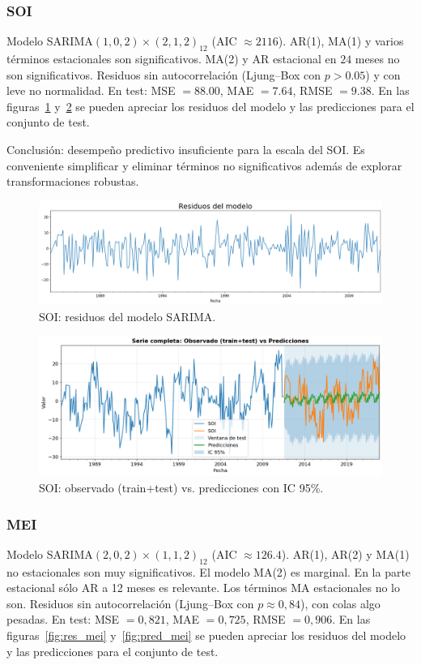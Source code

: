 \subsubsection{SOI}
Modelo SARIMA$(1,0,2)\times(2,1,2)_{12}$ (AIC $\approx 2116$).
AR(1), MA(1) y varios términos estacionales son significativos. MA(2) y AR estacional en
$24$ meses no son significativos. Residuos sin autocorrelación (Ljung--Box con $p>0.05$) y con leve
no normalidad. En test: MSE $=88.00$, MAE $=7.64$, RMSE $=9.38$. En las figuras~\ref{fig:res_soi} y~\ref{fig:pred_soi} se pueden apreciar los residuos del modelo y las predicciones para el conjunto de test.

Conclusión: desempeño predictivo insuficiente para la escala del SOI. Es conveniente simplificar y eliminar términos no significativos además de explorar transformaciones robustas.
\vspace{0.3em}

\begin{figure}[H]\centering
\includegraphics[scale=.30]{Figures/res_sarima_soi.png}
\caption{SOI: residuos del modelo SARIMA.}
\label{fig:res_soi}
\end{figure}


\begin{figure}[H]\centering
\includegraphics[scale=.42]{Figures/pred_soi.png}
\caption{SOI: observado (train+test) vs. predicciones con IC 95\%.}
\label{fig:pred_soi}
\end{figure}


\subsubsection{MEI}
Modelo SARIMA$(2,0,2)\times(1,1,2)_{12}$ (AIC $\approx 126.4$).
AR(1), AR(2) y MA(1) no estacionales son muy significativos. El modelo MA(2) es marginal. 
En la parte estacional sólo AR a 12 meses es relevante. Los términos MA estacionales no lo son.
Residuos sin autocorrelación (Ljung--Box con $p\approx 0,84$), con colas algo pesadas.
En test: MSE $=0,821$, MAE $=0,725$, RMSE $=0,906$. En las figuras~\ref{fig:res_mei} y~\ref{fig:pred_mei} se pueden apreciar los residuos del modelo y las predicciones para el conjunto de test.

